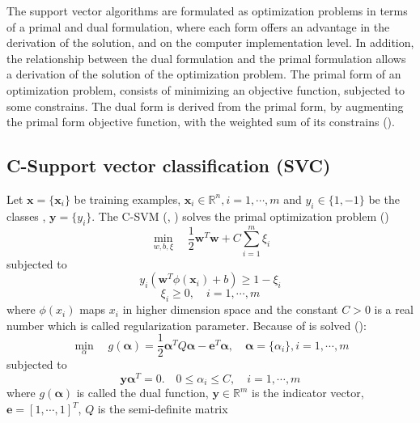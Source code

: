 \documentclass[../Main/thesis.tex]{subfiles}
\begin{document}
\justify
The support vector algorithms are formulated as optimization problems in terms of a primal and dual formulation, where each form offers an advantage in the derivation of the solution, and on the computer implementation level. In addition, the relationship between the dual formulation and the primal formulation allows a derivation of the solution of the optimization problem. 
\justify
The primal form of an optimization problem, consists of minimizing an objective function, subjected to some constrains. The dual form is derived from the primal form, by augmenting the primal form objective function, with the weighted sum of its constrains (\cite{boyd2004}). 

\subsection{C-Support vector classification (SVC)}
Let $\bm{x} = \{ \bm{x}_{i}\}$ be training examples, $\bm{x}_{i}\in \mathbb{R}^{n}, i = 1, \cdots, m$ and $y_{i}\in \{1,-1\}$ be the classes , $\bm{y} = \{ y_{i} \}$. The C-SVM (\cite{bosser1992}, \cite{vapnik1995}) solves the primal optimization problem (\cite{chang2001})
\begin{equation}
	\min_{w,b,\xi} \quad \frac{1}{2}\bm{w}^{T}\bm{w} + C\sum_{i = 1}^{m}\xi_{i}
\end{equation}
subjected to 
\begin{equation}
	y_{i}(\bm{w}^{T}\phi(\bm{x}_{i}) + b) \geq 1 - \xi_{i}
\end{equation}
\begin{equation}
	\xi_{i} \geq 0, \quad i = 1, \cdots, m
\end{equation}
where $\phi(x_{i})$ maps $x_{i}$ in higher dimension space and the constant $C > 0$ is a real number which is called regularization parameter.
Because of  is solved (\cite{chang2001}):
\begin{equation}\label{eq:cdual1}
	\min_{\alpha}\quad g(\bm{\alpha}) = \frac{1}{2}\bm{\alpha}^{T}Q\bm{\alpha}-\bm{e}^{T}\bm{\alpha}, \quad \bm{\alpha}=\{\alpha_{i}\}, i=1,\cdots,m
\end{equation}
subjected to 
\begin{equation}\label{eq:cdual2}
	\bm{y}\bm{\alpha}^{T} = 0. \quad 0 \leq \alpha_{i} \leq C,\quad  i = 1,\cdots, m
\end{equation}
\justify
where $g(\bm{\alpha})$ is called the dual function, $\bm{y}\in \mathbb{R}^{m}$ is the indicator vector, $\bm{e} = [1,\cdots,1]^{T}$, $Q$ is the semi-definite matrix
\end{document}
